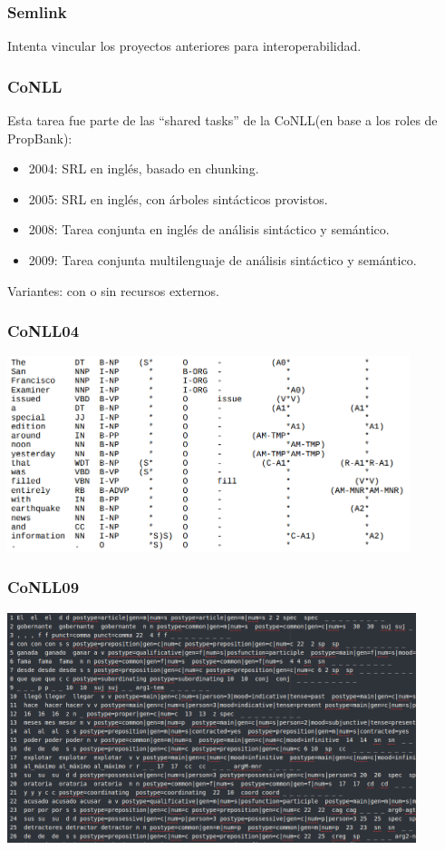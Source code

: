 \documentclass{beamer}
\begin{document}
\begin{frame}
  \frametitle{Semlink}

  Intenta vincular los proyectos anteriores para interoperabilidad.
\end{frame}

\begin{frame}
  \frametitle{CoNLL}

  Esta tarea fue parte de las ``shared tasks'' de la CoNLL\@ (en base a los roles de PropBank):

  \begin{itemize}
    \item 2004: SRL en inglés, basado en chunking.
    \item 2005: SRL en inglés, con árboles sintácticos provistos.
    \item 2008: Tarea conjunta en inglés de análisis sintáctico y semántico.
    \item 2009: Tarea conjunta multilenguaje de análisis sintáctico y semántico.
  \end{itemize}

  Variantes: con o sin recursos externos.
\end{frame}

\begin{frame}
  \frametitle{CoNLL04}

  \includegraphics[height=5.7cm]{conll04.png}
\end{frame}

\begin{frame}
  \frametitle{CoNLL09}

  \includegraphics[height=6.7cm]{conll09.png}
\end{frame}
\end{document}
